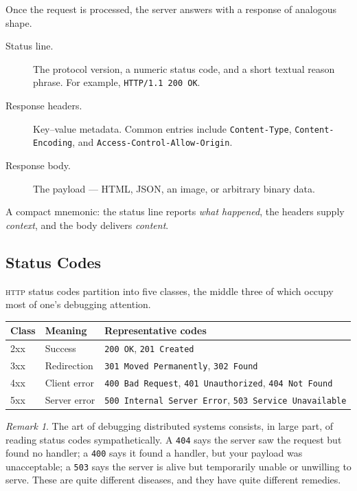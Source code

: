 \documentclass[11pt,a4paper]{article}
\theoremstyle{definition}
\theoremstyle{remark}
\newtheorem*{remark}{Remark}
\begin{document}
Once the request is processed, the server answers with a response of analogous shape.

\begin{description}
    \item[Status line.] The protocol version, a numeric status code, and a short textual reason phrase. For example, \texttt{HTTP/1.1 200 OK}.
    \item[Response headers.] Key--value metadata. Common entries include \texttt{Content-Type}, \texttt{Content-Encoding}, and \texttt{Access-Control-Allow-Origin}.
    \item[Response body.] The payload --- HTML, JSON, an image, or arbitrary binary data.
\end{description}

A compact mnemonic: the status line reports \emph{what happened}, the headers supply \emph{context}, and the body delivers \emph{content}.

\subsection{Status Codes}

\textsc{http} status codes partition into five classes, the middle three of which occupy most of one's debugging attention.

\begin{center}
\renewcommand{\arraystretch}{1.25}
\begin{tabular}{@{}l l l@{}}
\toprule
\textbf{Class} & \textbf{Meaning}      & \textbf{Representative codes} \\
\midrule
2xx  & Success               & \texttt{200 OK}, \texttt{201 Created} \\
3xx  & Redirection           & \texttt{301 Moved Permanently}, \texttt{302 Found} \\
4xx  & Client error          & \texttt{400 Bad Request}, \texttt{401 Unauthorized}, \texttt{404 Not Found} \\
5xx  & Server error          & \texttt{500 Internal Server Error}, \texttt{503 Service Unavailable} \\
\bottomrule
\end{tabular}
\end{center}

\begin{remark}
The art of debugging distributed systems consists, in large part, of reading status codes sympathetically. A \texttt{404} says the server saw the request but found no handler; a \texttt{400} says it found a handler, but your payload was unacceptable; a \texttt{503} says the server is alive but temporarily unable or unwilling to serve. These are quite different diseases, and they have quite different remedies.
\end{remark}
\end{document}
